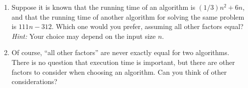 \begin{enumerate}

\item  Suppose it is known that the running time of an algorithm is
$(1/3)n^2 + 6n$, and that the running time of another algorithm for
solving the same problem is $111n -312$. Which one would you prefer,
assuming all other factors equal?  {\em Hint:} Your choice may depend
on the input size $n$.

\item  Of course, ``all other factors'' are never exactly equal for two
algorithms.  There is no question that execution time is important, but
there are other factors to consider when choosing an algorithm.  Can
you think of other considerations?

\end{enumerate}
